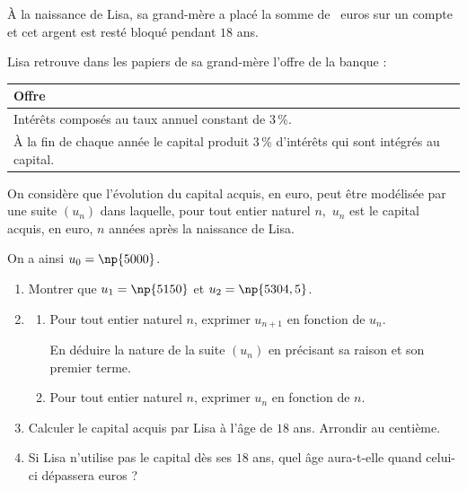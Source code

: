 \medskip

À la naissance de Lisa, sa grand-mère a placé la somme de ~euros sur un compte et cet argent est resté bloqué pendant $18$ ans.

Lisa retrouve dans les papiers de sa grand-mère l'offre de la banque :

\begin{center}
\begin{tabularx}{\linewidth}{|X|}\hline
\textbf{Offre}\\ \hline
Intérêts composés au taux annuel constant de 3\,\%.\\
À la fin de chaque année le capital produit 3\,\% d'intérêts qui sont intégrés au capital.\\ \hline
\end{tabularx}
\end{center}

On considère que l'évolution du capital acquis, en euro, peut être modélisée par une suite 
$\left(u_n\right)$ dans laquelle, pour tout entier naturel $n$,\, $u_n$ est le capital acquis, en euro, $n$ années après la naissance de Lisa.

On a ainsi $u_0 = \np{5000}$.

\medskip

\begin{enumerate}
\item Montrer que $u_1 = \np{5150}$ et $u_2 = \np{5304,5}$. 
\item 
	\begin{enumerate}
		\item Pour tout entier naturel $n$, exprimer $u_{n+1}$ en fonction de $u_n$. 
		
En déduire la nature de la suite $\left(u_n\right)$  en précisant sa raison et son premier terme.
		\item Pour tout entier naturel $n$, exprimer $u_n$ en fonction de $n$.
	\end{enumerate}
\item  Calculer le capital acquis par Lisa à l'âge de $18$ ans. Arrondir au centième.
\item  Si Lisa n'utilise pas le capital dès ses $18$ ans, quel âge aura-t-elle quand celui-ci dépassera  euros ?
\end{enumerate}

\bigskip
